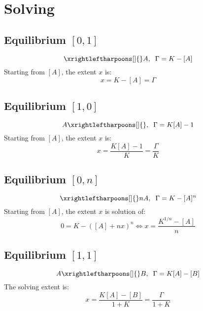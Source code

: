 \documentclass[aps,12pt]{revtex4}
\begin{document}
\section{Solving}

\subsection{Equilibrium $[0,1]$}
\begin{equation}
	\xrightleftharpoons[]{} A, \;\; \Gamma = K - [A]
\end{equation}
Starting from $[A]$, the extent $x$ is:
\begin{equation}
	x = K-[A] = \Gamma
\end{equation}

\subsection{Equilibrium $[1,0]$}
\begin{equation}
	A \xrightleftharpoons[]{} , \;\; \Gamma = K[A]-1
\end{equation}
Starting from $[A]$, the extent $x$ is:
\begin{equation}
	x = \dfrac{K[A]-1}{K} = \dfrac{\Gamma}{K}
\end{equation}

\subsection{Equilibrium $[0,n]$}
\begin{equation}
	\xrightleftharpoons[]{} n A, \;\; \Gamma = K - [A]^n
\end{equation}
Starting from $[A]$, the extent $x$ is solution of:
\begin{equation}
	0 = K-([A]+nx)^n \Leftrightarrow x = \dfrac{K^{1/n} - [A]}{n}
\end{equation}



\subsection{Equilibrium $[1,1]$}

\begin{equation}
	A \xrightleftharpoons[]{} B, \;\; \Gamma = K[A] - [B]
\end{equation}
The solving extent is:
\begin{equation}
	x = \dfrac{K[A]-[B]}{1+K} = \dfrac{\Gamma}{1+K}
\end{equation}
\end{document}
